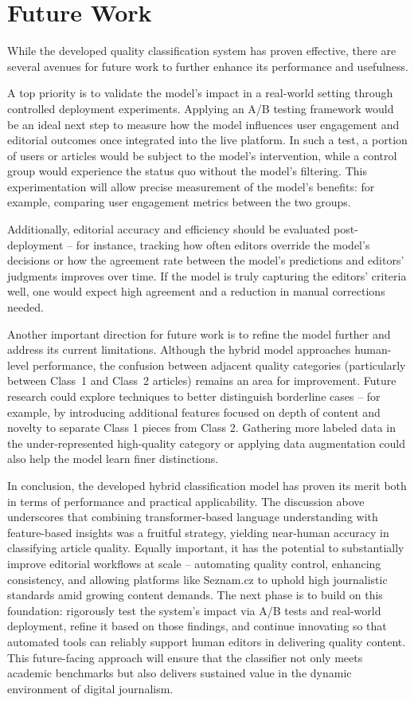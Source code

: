 \chapter{Future Work\label{chap:future_work}}

While the developed quality classification system has proven effective, there are several avenues for future work to further enhance its performance and usefulness. 

A top priority is to validate the model’s impact in a real-world setting through controlled deployment experiments. Applying an A/B testing framework would be an ideal next step to measure how the model influences user engagement and editorial outcomes once integrated into the live platform. In such a test, a portion of users or articles would be subject to the model’s intervention, while a control group would experience the status quo without the model’s filtering. This experimentation will allow precise measurement of the model’s benefits: for example, comparing user engagement metrics between the two groups. 

Additionally, editorial accuracy and efficiency should be evaluated post-deployment – for instance, tracking how often editors override the model’s decisions or how the agreement rate between the model’s predictions and editors’ judgments improves over time. If the model is truly capturing the editors’ criteria well, one would expect high agreement and a reduction in manual corrections needed.

Another important direction for future work is to refine the model further and address its current limitations. Although the hybrid model approaches human-level performance, the confusion between adjacent quality categories (particularly between Class 1 and Class 2 articles) remains an area for improvement. Future research could explore techniques to better distinguish borderline cases – for example, by introducing additional features focused on depth of content and novelty to separate \ac{Class 1} pieces from \ac{Class 2}. Gathering more labeled data in the under-represented high-quality category or applying data augmentation could also help the model learn finer distinctions. 

In conclusion, the developed hybrid classification model has proven its merit both in terms of performance and practical applicability. The discussion above underscores that combining transformer-based language understanding with feature-based insights was a fruitful strategy, yielding near-human accuracy in classifying article quality. Equally important, it has the potential to substantially improve editorial workflows at scale – automating quality control, enhancing consistency, and allowing platforms like Seznam.cz to uphold high journalistic standards amid growing content demands. The next phase is to build on this foundation: rigorously test the system’s impact via A/B tests and real-world deployment, refine it based on those findings, and continue innovating so that automated tools can reliably support human editors in delivering quality content. This future-facing approach will ensure that the classifier not only meets academic benchmarks but also delivers sustained value in the dynamic environment of digital journalism.

